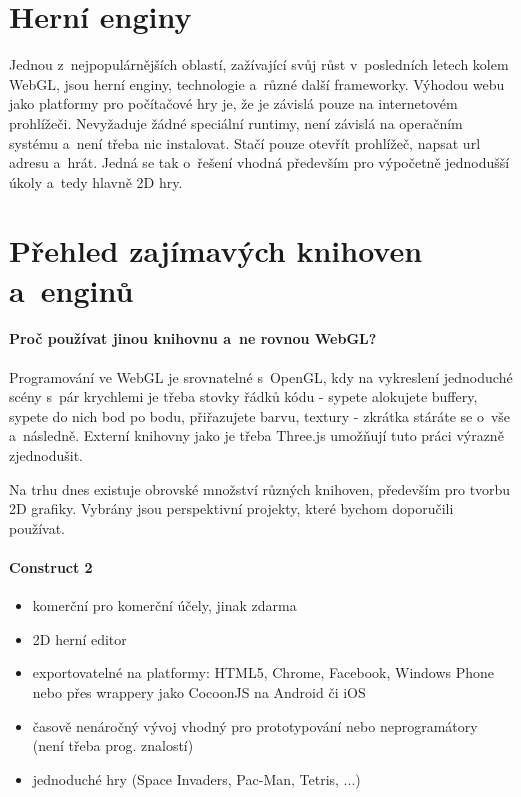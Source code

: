 \documentclass[12pt,a4paper,titlepage,final]{report}
\begin{document}
\section{Herní enginy}

Jednou z~nejpopulárnějších oblastí, zažívající svůj růst v~posledních letech kolem WebGL, jsou herní enginy, technologie a~různé další frameworky. Výhodou webu jako platformy pro počítačové hry je, že je závislá pouze na internetovém prohlížeči. Nevyžaduje žádné speciální runtimy, není závislá na operačním systému a~není třeba nic instalovat. Stačí pouze otevřít prohlížeč, napsat url adresu a~hrát. Jedná se tak o~řešení vhodná především pro výpočetně jednodušší úkoly a~tedy 
hlavně 2D hry.

\section{Přehled zajímavých knihoven a~enginů}

\paragraph{Proč používat jinou knihovnu a~ne rovnou WebGL?} Programování ve WebGL je srovnatelné s~OpenGL, kdy na vykreslení jednoduché scény s~pár krychlemi je třeba stovky řádků kódu - sypete alokujete buffery, sypete do nich bod po bodu, přiřazujete barvu, textury - zkrátka stáráte se o~vše a~následně. Externí knihovny jako je třeba Three.js umožňují tuto práci výrazně zjednodušit.

Na trhu dnes existuje obrovské množství různých knihoven, především pro tvorbu 2D grafiky. Vybrány jsou perspektivní projekty, které bychom doporučili používat.

\paragraph{Construct 2}  \cite{construct2}

\begin{itemize}
	\item komerční pro komerční účely, jinak zdarma
	\item 2D herní editor
	\item exportovatelné na platformy: HTML5, Chrome, Facebook, Windows Phone nebo přes wrappery jako CocoonJS na Android či iOS
	\item časově nenáročný vývoj vhodný pro prototypování nebo neprogramátory (není třeba prog. znalostí)
	\item jednoduché hry (Space Invaders, Pac-Man, Tetris, ...)
\end{itemize}
\end{document}
